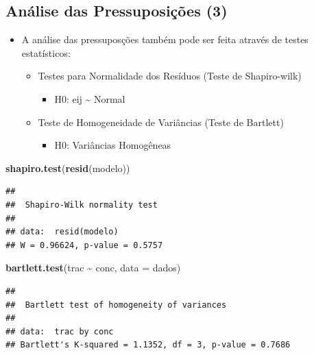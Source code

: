 \documentclass[
]{book}
\newenvironment{Shaded}{\begin{snugshade}}{\end{snugshade}}
\newcommand{\AttributeTok}[1]{\textcolor[rgb]{0.13,0.29,0.53}{#1}}
\newcommand{\FunctionTok}[1]{\textcolor[rgb]{0.13,0.29,0.53}{\textbf{#1}}}
\newcommand{\NormalTok}[1]{#1}
\newcommand{\SpecialCharTok}[1]{\textcolor[rgb]{0.81,0.36,0.00}{\textbf{#1}}}
\providecommand{\tightlist}{%
  \setlength{\itemsep}{0pt}\setlength{\parskip}{0pt}}
\begin{document}
\subsection{Análise das Pressuposições (3)}\label{anuxe1lise-das-pressuposiuxe7uxf5es-3}

\begin{itemize}
\tightlist
\item
  A análise das pressuposções também pode ser feita através de testes estatísticos:

  \begin{itemize}
  \tightlist
  \item
    Testes para Normalidade dos Resíduos (Teste de Shapiro-wilk)

    \begin{itemize}
    \tightlist
    \item
      H0: eij \textasciitilde{} Normal
    \end{itemize}
  \item
    Teste de Homogeneidade de Variâncias (Teste de Bartlett)

    \begin{itemize}
    \tightlist
    \item
      H0: Variâncias Homogêneas
    \end{itemize}
  \end{itemize}
\end{itemize}

\begin{Shaded}
\begin{Highlighting}[]
\FunctionTok{shapiro.test}\NormalTok{(}\FunctionTok{resid}\NormalTok{(modelo))}
\end{Highlighting}
\end{Shaded}

\begin{verbatim}
## 
##  Shapiro-Wilk normality test
## 
## data:  resid(modelo)
## W = 0.96624, p-value = 0.5757
\end{verbatim}

\begin{Shaded}
\begin{Highlighting}[]
\FunctionTok{bartlett.test}\NormalTok{(trac }\SpecialCharTok{\textasciitilde{}}\NormalTok{ conc, }\AttributeTok{data =}\NormalTok{ dados)}
\end{Highlighting}
\end{Shaded}

\begin{verbatim}
## 
##  Bartlett test of homogeneity of variances
## 
## data:  trac by conc
## Bartlett's K-squared = 1.1352, df = 3, p-value = 0.7686
\end{verbatim}
\end{document}
